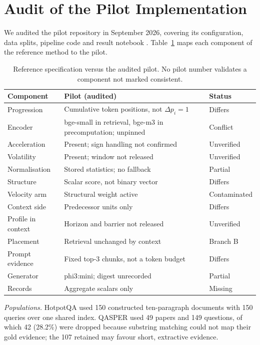 \documentclass[conference,a4paper]{IEEEtran}
\begin{document}
\section{Audit of the Pilot Implementation}
\label{sec:audit}

We audited the pilot repository in September 2026, covering its configuration, data splits, pipeline code and result notebook \cite{stpaudit2026}. Table~\ref{tab:reconcile} maps each component of the reference method to the pilot.

\begin{table}[t]
\caption{Reference specification versus the audited pilot. No pilot number validates a component not marked consistent.}
\label{tab:reconcile}
\centering
\footnotesize
\setlength{\tabcolsep}{2.5pt}
\begin{tabularx}{\columnwidth}{@{}>{\raggedright\arraybackslash}p{}>{\raggedright\arraybackslash}X>{\raggedright\arraybackslash}p{}@{}}
\toprule
Component & Pilot (audited) & Status \\
\midrule
Progression & Cumulative token positions, not $\Delta p_i=1$ & Differs \\
Encoder & bge-small in retrieval, bge-m3 in precomputation; unpinned & Conflict \\
Acceleration & Present; sign handling not confirmed & Unverified \\
Volatility & Present; window not released & Unverified \\
Normalisation & Stored statistics; no fallback & Partial \\
Structure & Scalar score, not binary vector & Differs \\
Velocity arm & Structural weight active & Contaminated \\
Context side & Predecessor units only & Differs \\
Profile in context & Horizon and barrier not released & Unverified \\
Placement & Retrieval unchanged by context & Branch B \\
Prompt evidence & Fixed top-3 chunks, not a token budget & Differs \\
Generator & phi3:mini; digest unrecorded & Partial \\
Records & Aggregate scalars only & Missing \\
\bottomrule
\end{tabularx}
\end{table}

\textit{Populations.} HotpotQA used 150 constructed ten-paragraph documents with 150 queries over one shared index. QASPER used 49 papers and 149 questions, of which 42 (28.2\%) were dropped because substring matching could not map their gold evidence; the 107 retained may favour short, extractive evidence.
\end{document}
